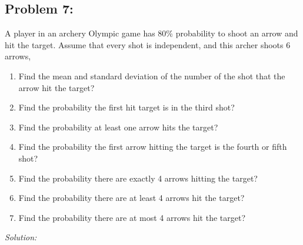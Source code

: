 \documentclass[a4paper]{article}
\begin{document}
	\subsection*{Problem 7:}
	A player in an archery Olympic game has 80\% probability to shoot an arrow and hit the target. Assume that every shot is independent, and this archer shoots 6 arrows,
	\begin{enumerate}
		\item Find the mean and standard deviation of the number of the shot that the arrow hit the target?
		\item Find the probability the first hit target is in the third shot?
		\item Find the probability at least one arrow hits the target?
		\item Find the probability the first arrow hitting the target is the fourth or fifth shot?
		\item Find the probability there are exactly 4 arrows hitting the target?
		\item Find the probability there are at least 4 arrows hit the target?
		\item Find the probability there are at most 4 arrows hit the target?
	\end{enumerate}
	\textit{Solution:}\\
\end{document}
